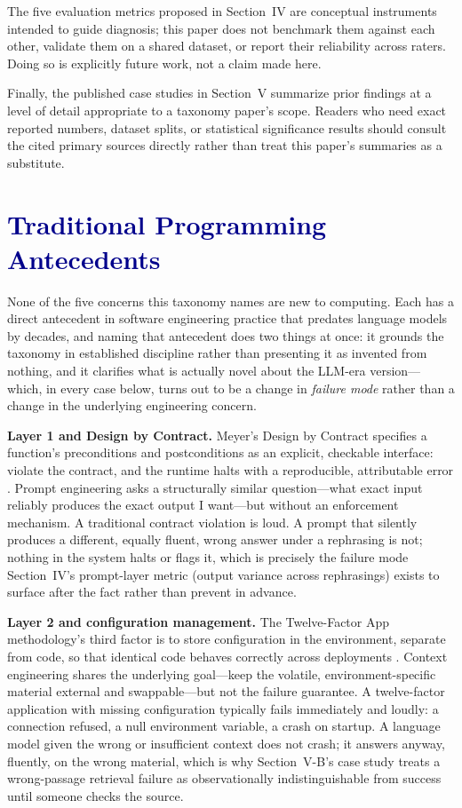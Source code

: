 \documentclass[journal]{IEEEtran}
\begin{document}
The five evaluation metrics proposed in Section~IV are conceptual instruments intended to guide diagnosis; this paper does not benchmark them against each other, validate them on a shared dataset, or report their reliability across raters. Doing so is explicitly future work, not a claim made here.

Finally, the published case studies in Section~V summarize prior findings at a level of detail appropriate to a taxonomy paper's scope. Readers who need exact reported numbers, dataset splits, or statistical significance results should consult the cited primary sources directly rather than treat this paper's summaries as a substitute.

\section{\textcolor{darkblue}{Traditional Programming Antecedents}}

None of the five concerns this taxonomy names are new to computing. Each has a direct antecedent in software engineering practice that predates language models by decades, and naming that antecedent does two things at once: it grounds the taxonomy in established discipline rather than presenting it as invented from nothing, and it clarifies what is actually novel about the LLM-era version---which, in every case below, turns out to be a change in \emph{failure mode} rather than a change in the underlying engineering concern.

\textbf{Layer 1 and Design by Contract.} Meyer's Design by Contract specifies a function's preconditions and postconditions as an explicit, checkable interface: violate the contract, and the runtime halts with a reproducible, attributable error \cite{meyer1992applying}. Prompt engineering asks a structurally similar question---what exact input reliably produces the exact output I want---but without an enforcement mechanism. A traditional contract violation is loud. A prompt that silently produces a different, equally fluent, wrong answer under a rephrasing is not; nothing in the system halts or flags it, which is precisely the failure mode Section~IV's prompt-layer metric (output variance across rephrasings) exists to surface after the fact rather than prevent in advance.

\textbf{Layer 2 and configuration management.} The Twelve-Factor App methodology's third factor is to store configuration in the environment, separate from code, so that identical code behaves correctly across deployments \cite{wiggins2017twelve}. Context engineering shares the underlying goal---keep the volatile, environment-specific material external and swappable---but not the failure guarantee. A twelve-factor application with missing configuration typically fails immediately and loudly: a connection refused, a null environment variable, a crash on startup. A language model given the wrong or insufficient context does not crash; it answers anyway, fluently, on the wrong material, which is why Section~V-B's case study treats a wrong-passage retrieval failure as observationally indistinguishable from success until someone checks the source.
\end{document}
